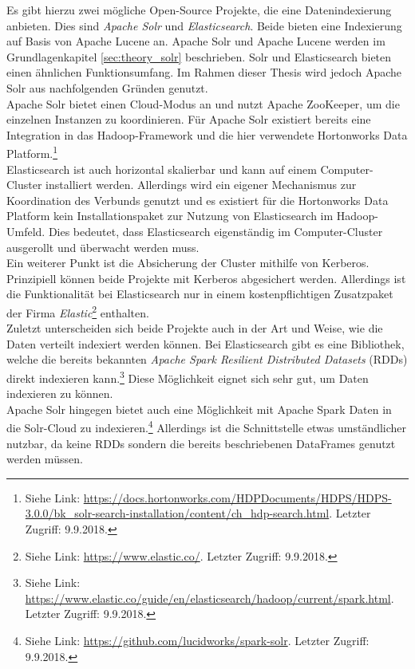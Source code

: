 \noindent 
Es gibt hierzu zwei mögliche Open-Source Projekte, die eine Datenindexierung anbieten. Dies sind \textit{Apache Solr\texttrademark} und \textit{Elasticsearch\texttrademark}. Beide bieten eine Indexierung auf Basis von Apache Lucene an. Apache Solr und Apache Lucene werden im Grundlagenkapitel \ref{sec:theory_solr} beschrieben. Solr und Elasticsearch bieten einen ähnlichen Funktionsumfang. Im Rahmen dieser Thesis wird jedoch Apache Solr aus nachfolgenden Gründen genutzt.\\
Apache Solr bietet einen Cloud-Modus an und nutzt Apache ZooKeeper, um die einzelnen Instanzen zu koordinieren. Für Apache Solr existiert bereits eine Integration in das Hadoop-Framework und die hier verwendete Hortonworks Data Platform.\footnote{Siehe Link: \url{https://docs.hortonworks.com/HDPDocuments/HDPS/HDPS-3.0.0/bk_solr-search-installation/content/ch_hdp-search.html}. Letzter Zugriff: 9.9.2018.}\\
Elasticsearch ist auch horizontal skalierbar und kann auf einem Computer-Cluster installiert werden. Allerdings wird ein eigener Mechanismus zur Koordination des Verbunds genutzt und es existiert für die Hortonworks Data Platform kein Installationspaket zur Nutzung von Elasticsearch im Hadoop-Umfeld. Dies bedeutet, dass Elasticsearch eigenständig im Computer-Cluster ausgerollt und überwacht werden muss.\\

\noindent
Ein weiterer Punkt ist die Absicherung der Cluster mithilfe von Kerberos. Prinzipiell können beide Projekte mit Kerberos abgesichert werden. Allerdings ist die Funktionalität bei Elasticsearch nur in einem kostenpflichtigen Zusatzpaket der Firma \textit{Elastic}\footnote{Siehe Link: \url{https://www.elastic.co/}. Letzter Zugriff: 9.9.2018.} enthalten.\\

\noindent
Zuletzt unterscheiden sich beide Projekte auch in der Art und Weise, wie die Daten verteilt indexiert werden können. Bei Elasticsearch gibt es eine Bibliothek, welche die bereits bekannten \textit{Apache Spark Resilient Distributed Datasets} (RDDs) direkt indexieren kann.\footnote{Siehe Link: \url{https://www.elastic.co/guide/en/elasticsearch/hadoop/current/spark.html}. Letzter Zugriff: 9.9.2018.} Diese Möglichkeit eignet sich sehr gut, um Daten indexieren zu können.\\
Apache Solr hingegen bietet auch eine Möglichkeit mit Apache Spark Daten in die Solr-Cloud zu indexieren.\footnote{Siehe Link: \url{https://github.com/lucidworks/spark-solr}. Letzter Zugriff: 9.9.2018.} Allerdings ist die Schnittstelle etwas umständlicher nutzbar, da keine RDDs sondern die bereits beschriebenen DataFrames genutzt werden müssen.\\

